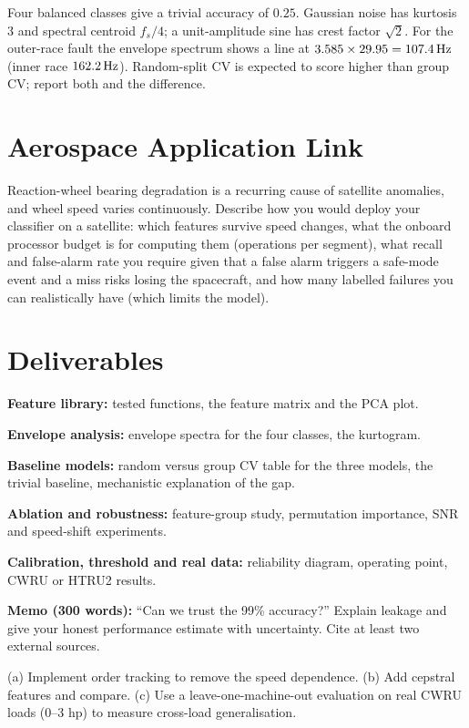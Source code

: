 \documentclass[11pt,a4paper]{article}
\begin{document}
\begin{checkpoint}
Four balanced classes give a trivial accuracy of $0.25$. Gaussian noise has kurtosis $3$ and spectral centroid $f_s/4$; a unit-amplitude sine has crest factor $\sqrt2$. For the outer-race fault the envelope spectrum shows a line at $3.585\times29.95=\SI{107.4}{\hertz}$ (inner race $\SI{162.2}{\hertz}$). Random-split CV is expected to score higher than group CV; report both and the difference.
\end{checkpoint}

\section*{Aerospace Application Link}
Reaction-wheel bearing degradation is a recurring cause of satellite anomalies, and wheel speed varies continuously. Describe how you would deploy your classifier on a satellite: which features survive speed changes, what the onboard processor budget is for computing them (operations per  segment), what recall and false-alarm rate you require given that a false alarm triggers a safe-mode event and a miss risks losing the spacecraft, and how many labelled failures you can realistically have (which limits the model).

\section*{Deliverables}
\begin{delivs}
  \item[D1] \textbf{Feature library:} tested functions, the feature matrix and the PCA plot.
  \item[D2] \textbf{Envelope analysis:} envelope spectra for the four classes, the kurtogram.
  \item[D3] \textbf{Baseline models:} random versus group CV table for the three models, the trivial baseline, mechanistic explanation of the gap.
  \item[D4] \textbf{Ablation and robustness:} feature-group study, permutation importance, SNR and speed-shift experiments.
  \item[D5] \textbf{Calibration, threshold and real data:} reliability diagram, operating point, CWRU or HTRU2 results.
  \item[D6] \textbf{Memo (300 words):} ``Can we trust the 99\% accuracy?'' Explain leakage and give your honest performance estimate with uncertainty. Cite at least two external sources.
  \item[Bonus] (a) Implement order tracking to remove the speed dependence. (b) Add cepstral features and compare. (c) Use a leave-one-machine-out evaluation on real CWRU loads (0--3 hp) to measure cross-load generalisation.
\end{delivs}
\end{document}
